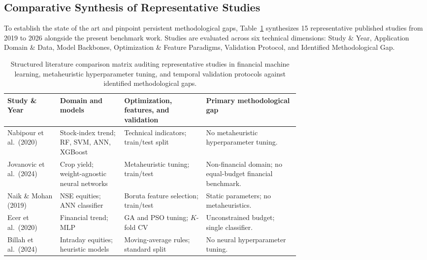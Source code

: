 \subsection{Comparative Synthesis of Representative Studies}\label{subsec:comparative_synthesis}

To establish the state of the art and pinpoint persistent methodological gaps, Table~\ref{tab:literature_gap} synthesizes 15 representative published studies from 2019 to 2026 alongside the present benchmark work. Studies are evaluated across six technical dimensions: Study \& Year, Application Domain \& Data, Model Backbones, Optimization \& Feature Paradigms, Validation Protocol, and Identified Methodological Gap.

\begin{table}[!htbp]
\caption{Structured literature comparison matrix auditing representative studies in financial machine learning, metaheuristic hyperparameter tuning, and temporal validation protocols against identified methodological gaps.}
\label{tab:literature_gap}
\centering
\manuscripttablestyle
\footnotesize
\begin{tabularx}{\linewidth}{@{}>{\raggedright\arraybackslash}p{0.18\linewidth} >{\raggedright\arraybackslash}p{0.22\linewidth} >{\raggedright\arraybackslash}p{0.29\linewidth} >{\raggedright\arraybackslash}X@{}}
\toprule
Study \& Year & Domain and models & Optimization, features, and validation & Primary methodological gap \\
\midrule
Nabipour et al.\ (2020) \cite{nabipour2020predicting} & Stock-index trend; RF, SVM, ANN, XGBoost & Technical indicators; train/test split & No metaheuristic hyperparameter tuning. \\
Jovanovic et al.\ (2024) \cite{jovanovic2024wann} & Crop yield; weight-agnostic neural networks & Metaheuristic tuning; train/test & Non-financial domain; no equal-budget financial benchmark. \\
Naik \& Mohan (2019) \cite{naik2019optimal} & NSE equities; ANN classifier & Boruta feature selection; train/test & Static parameters; no metaheuristics. \\
Ecer et al.\ (2020) \cite{ecer2020mlp_ga_pso} & Financial trend; MLP & GA and PSO tuning; $K$-fold CV & Unconstrained budget; single classifier. \\
Billah et al.\ (2024) \cite{billah2024nca_moving_average} & Intraday equities; heuristic models & Moving-average rules; standard split & No neural hyperparameter tuning. \\

\end{tabularx}
\end{table}
